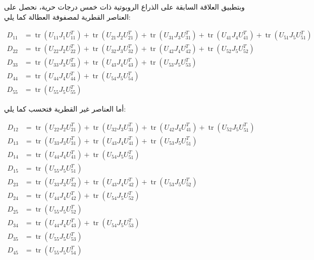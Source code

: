 وبتطبيق العلاقة السابقة على الذراع الروبوتية ذات خمس درجات حرية، نحصل على العناصر القطرية لمصفوفة العطالة كما يلي:

\begin{align*}
D_{11} &=
\operatorname{tr}(U_{11}J_1U_{11}^{T})
+
\operatorname{tr}(U_{21}J_2U_{21}^{T})
+
\operatorname{tr}(U_{31}J_3U_{31}^{T})
+
\operatorname{tr}(U_{41}J_4U_{41}^{T})
+
\operatorname{tr}(U_{51}J_5U_{51}^{T})
\\
D_{22} &=
\operatorname{tr}(U_{22}J_2U_{22}^{T})
+
\operatorname{tr}(U_{32}J_3U_{32}^{T})
+
\operatorname{tr}(U_{42}J_4U_{42}^{T})
+
\operatorname{tr}(U_{52}J_5U_{52}^{T})
\\
D_{33} &=
\operatorname{tr}(U_{33}J_3U_{33}^{T})
+
\operatorname{tr}(U_{43}J_4U_{43}^{T})
+
\operatorname{tr}(U_{53}J_5U_{53}^{T})
\\
D_{44} &=
\operatorname{tr}(U_{44}J_4U_{44}^{T})
+
\operatorname{tr}(U_{54}J_5U_{54}^{T})
\\
D_{55} &=
\operatorname{tr}(U_{55}J_5U_{55}^{T})
\end{align*}

أما العناصر غير القطرية فتحسب كما يلي:

\begin{align*}
D_{12} &=
\operatorname{tr}(U_{22}J_2U_{21}^{T})
+
\operatorname{tr}(U_{32}J_3U_{31}^{T})
+
\operatorname{tr}(U_{42}J_4U_{41}^{T})
+
\operatorname{tr}(U_{52}J_5U_{51}^{T})
\\
D_{13} &=
\operatorname{tr}(U_{33}J_3U_{31}^{T})
+
\operatorname{tr}(U_{43}J_4U_{41}^{T})
+
\operatorname{tr}(U_{53}J_5U_{51}^{T})
\\
D_{14} &=
\operatorname{tr}(U_{44}J_4U_{41}^{T})
+
\operatorname{tr}(U_{54}J_5U_{51}^{T})
\\
D_{15} &=
\operatorname{tr}(U_{55}J_5U_{51}^{T})
\\
D_{23} &=
\operatorname{tr}(U_{33}J_3U_{32}^{T})
+
\operatorname{tr}(U_{43}J_4U_{42}^{T})
+
\operatorname{tr}(U_{53}J_5U_{52}^{T})
\\
D_{24} &=
\operatorname{tr}(U_{44}J_4U_{42}^{T})
+
\operatorname{tr}(U_{54}J_5U_{52}^{T})
\\
D_{25} &=
\operatorname{tr}(U_{55}J_5U_{52}^{T})
\\
D_{34} &=
\operatorname{tr}(U_{44}J_4U_{43}^{T})
+
\operatorname{tr}(U_{54}J_5U_{53}^{T})
\\
D_{35} &=
\operatorname{tr}(U_{55}J_5U_{53}^{T})
\\
D_{45} &=
\operatorname{tr}(U_{55}J_5U_{54}^{T})
\end{align*}

